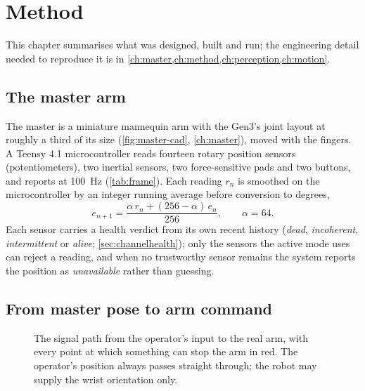 \chapter{Method}
\label{ch:methodsmain}

This chapter summarises what was designed, built and run; the engineering
detail needed to reproduce it is in
\cref{ch:master,ch:method,ch:perception,ch:motion}.

\section{The master arm}

The master is a miniature mannequin arm with the Gen3's joint layout at
roughly a third of its size (\cref{fig:master-cad}, \cref{ch:master}), moved
with the fingers. A Teensy 4.1 microcontroller reads fourteen rotary
position sensors (potentiometers), two inertial sensors, two
force-sensitive pads and two buttons, and reports at \SI{100}{\hertz}
(\cref{tab:frame}). Each reading $r_n$ is smoothed on the
microcontroller by an integer running average before conversion to degrees,
\begin{equation}
  e_{n+1} = \frac{\alpha\, r_n + (256-\alpha)\, e_n}{256}, \qquad \alpha = 64.
  \label{eq:ema-main}
\end{equation}
Each sensor carries a health
verdict from its own recent history (\emph{dead}, \emph{incoherent},
\emph{intermittent} or \emph{alive}; \cref{sec:channelhealth}); only the
sensors the active mode uses can reject a reading, and when no trustworthy
sensor remains the system reports the position as \emph{unavailable} rather
than guessing.

\section{From master pose to arm command}

\begin{figure}[htbp]
  \centering
  
  \caption[The signal path from operator to robot]{The signal path from the
  operator's input to the real arm, with every point at which something can
  stop the arm in red. The operator's position always passes straight
  through; the robot may supply the wrist orientation only.}
  \label{fig:signal-path}
\end{figure}


